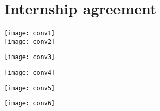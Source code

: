 
\chapter{Internship agreement}

\texttt{[image: conv1]}
~\\

\texttt{[image: conv2]}

\texttt{[image: conv3]}

\texttt{[image: conv4]}

\texttt{[image: conv5]}

\texttt{[image: conv6]}




